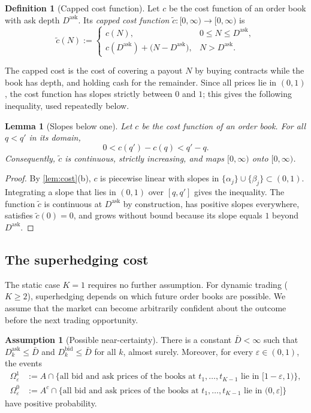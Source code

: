 \documentclass[11pt,a4paper]{article}
\theoremstyle{plain}
\newtheorem{lemma}[theorem]{Lemma}
\theoremstyle{definition}
\newtheorem{definition}[theorem]{Definition}
\newtheorem{assumption}[theorem]{Assumption}
\theoremstyle{remark}
\newcommand{\1}{\mathbf{1}}
\begin{document}
\begin{definition}[Capped cost function]
\label{def:capped}
Let $c$ be the cost function of an order book with ask depth $D^{\mathrm{ask}}$. Its \emph{capped cost function} $\tilde c:[0,\infty)\to[0,\infty)$ is
\[
\tilde c(N) :=
\begin{cases}
c(N), & 0\leq N\leq D^{\mathrm{ask}},\\
c(D^{\mathrm{ask}}) + \bigl(N - D^{\mathrm{ask}}\bigr), & N> D^{\mathrm{ask}}.
\end{cases}
\]
\end{definition}

The capped cost is the cost of covering a payout $N$ by buying contracts while the book has depth, and holding cash for the remainder. Since all prices lie in $(0,1)$, the cost function has slopes strictly between $0$ and $1$; this gives the following inequality, used repeatedly below.

\begin{lemma}[Slopes below one]
\label{lem:slope}
Let $c$ be the cost function of an order book. For all $q<q'$ in its domain,
\[
0 < c(q') - c(q) < q' - q.
\]
Consequently, $\tilde c$ is continuous, strictly increasing, and maps $[0,\infty)$ onto $[0,\infty)$.
\end{lemma}

\begin{proof}
By \cref{lem:cost}(b), $c$ is piecewise linear with slopes in $\{\alpha_j\}\cup\{\beta_j\}\subset(0,1)$. Integrating a slope that lies in $(0,1)$ over $[q,q']$ gives the inequality. The function $\tilde c$ is continuous at $D^{\mathrm{ask}}$ by construction, has positive slopes everywhere, satisfies $\tilde c(0)=0$, and grows without bound because its slope equals $1$ beyond $D^{\mathrm{ask}}$.
\end{proof}

\subsection{The superhedging cost}

The static case $K=1$ requires no further assumption. For dynamic trading ($K\geq 2$), superhedging depends on which future order books are possible. We assume that the market can become arbitrarily confident about the outcome before the next trading opportunity.

\begin{assumption}[Possible near-certainty]
\label{ass:certainty}
There is a constant $\bar D<\infty$ such that $D^{\mathrm{ask}}_k\leq\bar D$ and $D^{\mathrm{bid}}_k\leq\bar D$ for all $k$, almost surely. Moreover, for every $\varepsilon\in(0,1)$, the events
\begin{align*}
\Omega^{1}_\varepsilon &:= A\cap\bigl\{\text{all bid and ask prices of the books at } t_1,\dots,t_{K-1} \text{ lie in } [1-\varepsilon,1)\bigr\},\\
\Omega^{0}_\varepsilon &:= A^c\cap\bigl\{\text{all bid and ask prices of the books at } t_1,\dots,t_{K-1} \text{ lie in } (0,\varepsilon]\bigr\}
\end{align*}
have positive probability.
\end{assumption}
\end{document}
